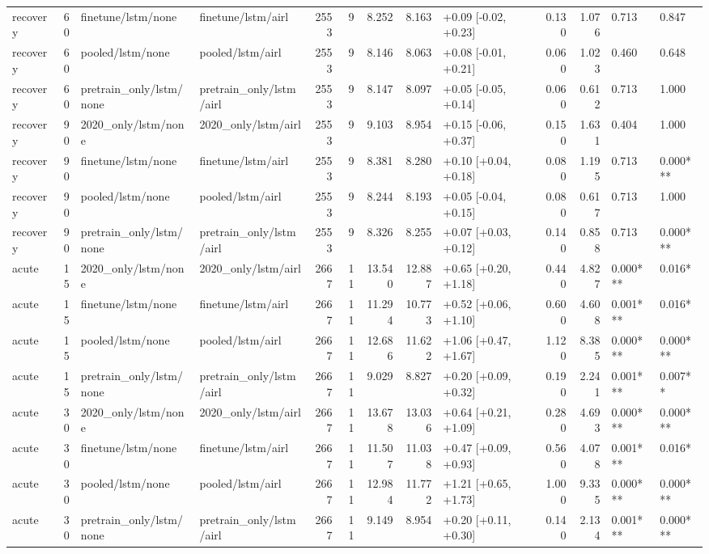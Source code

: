 \begin{tabular}{lrllrrrrlrrll}
recovery & 60 & finetune/lstm/none & finetune/lstm/airl & 2553 & 9 & 8.252 & 8.163 & +0.09 [-0.02, +0.23] & 0.130 & 1.076 & 0.713 & 0.847 \\
recovery & 60 & pooled/lstm/none & pooled/lstm/airl & 2553 & 9 & 8.146 & 8.063 & +0.08 [-0.01, +0.21] & 0.060 & 1.023 & 0.460 & 0.648 \\
recovery & 60 & pretrain_only/lstm/none & pretrain_only/lstm/airl & 2553 & 9 & 8.147 & 8.097 & +0.05 [-0.05, +0.14] & 0.060 & 0.612 & 0.713 & 1.000 \\
recovery & 90 & 2020_only/lstm/none & 2020_only/lstm/airl & 2553 & 9 & 9.103 & 8.954 & +0.15 [-0.06, +0.37] & 0.150 & 1.631 & 0.404 & 1.000 \\
recovery & 90 & finetune/lstm/none & finetune/lstm/airl & 2553 & 9 & 8.381 & 8.280 & +0.10 [+0.04, +0.18] & 0.080 & 1.195 & 0.713 & 0.000*** \\
recovery & 90 & pooled/lstm/none & pooled/lstm/airl & 2553 & 9 & 8.244 & 8.193 & +0.05 [-0.04, +0.15] & 0.080 & 0.617 & 0.713 & 1.000 \\
recovery & 90 & pretrain_only/lstm/none & pretrain_only/lstm/airl & 2553 & 9 & 8.326 & 8.255 & +0.07 [+0.03, +0.12] & 0.140 & 0.858 & 0.713 & 0.000*** \\
acute & 15 & 2020_only/lstm/none & 2020_only/lstm/airl & 2667 & 11 & 13.540 & 12.887 & +0.65 [+0.20, +1.18] & 0.440 & 4.827 & 0.000*** & 0.016* \\
acute & 15 & finetune/lstm/none & finetune/lstm/airl & 2667 & 11 & 11.294 & 10.773 & +0.52 [+0.06, +1.10] & 0.600 & 4.608 & 0.001*** & 0.016* \\
acute & 15 & pooled/lstm/none & pooled/lstm/airl & 2667 & 11 & 12.686 & 11.622 & +1.06 [+0.47, +1.67] & 1.120 & 8.385 & 0.000*** & 0.000*** \\
acute & 15 & pretrain_only/lstm/none & pretrain_only/lstm/airl & 2667 & 11 & 9.029 & 8.827 & +0.20 [+0.09, +0.32] & 0.190 & 2.241 & 0.001*** & 0.007** \\
acute & 30 & 2020_only/lstm/none & 2020_only/lstm/airl & 2667 & 11 & 13.678 & 13.036 & +0.64 [+0.21, +1.09] & 0.280 & 4.693 & 0.000*** & 0.000*** \\
acute & 30 & finetune/lstm/none & finetune/lstm/airl & 2667 & 11 & 11.507 & 11.038 & +0.47 [+0.09, +0.93] & 0.560 & 4.078 & 0.001*** & 0.016* \\
acute & 30 & pooled/lstm/none & pooled/lstm/airl & 2667 & 11 & 12.984 & 11.772 & +1.21 [+0.65, +1.73] & 1.000 & 9.335 & 0.000*** & 0.000*** \\
acute & 30 & pretrain_only/lstm/none & pretrain_only/lstm/airl & 2667 & 11 & 9.149 & 8.954 & +0.20 [+0.11, +0.30] & 0.140 & 2.134 & 0.001*** & 0.000*** \\

\end{tabular}
